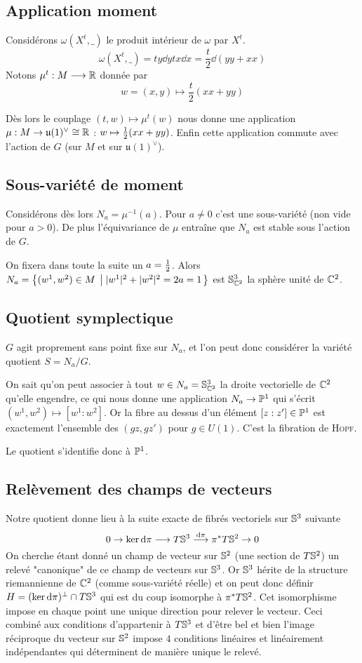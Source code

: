 \documentclass[a4paper,10pt]{article}
\begin{document}
\subsection{Application moment}
Considérons $\omega(X^t,\_)$ le produit intérieur de $\omega$ par $X^t$.
\[
\omega(X^t,\_) = ty\dd y tx \dd x = \dfrac{t}{2}\dd (yy + xx) 
\]
Notons $\mu^t : M \longrightarrow \R$ donnée par \[
w=(x,y) \mapsto \dfrac{t}{2}( xx + yy )\]

Dès lors le couplage $(t,w) \mapsto \mu^t(w)$ nous donne une application $\mu : M \rightarrow \mathfrak{u}(1)^\vee \cong \R$ : 
$w \mapsto \demi( xx + yy )$.
Enfin cette application commute avec l'action de $G$ (sur $M$ et sur $\mathfrak{u}(1)^\vee$).

\subsection{Sous-variété de moment}
Considérons dès lors $N_a = \mu^{-1}(a)$. Pour $a \neq 0$ c'est une sous-variété (non vide pour $a>0$). De plus l'équivariance de $\mu$ entraîne que $N_a$ est stable sous l'action de $G$.

On fixera dans toute la suite un $a=\demi$. Alors $N_a = \ens{(w^1,w^2)\in M}{|w^1|^2 + |w^2|^2 = 2a = 1}$ est $\S^3_{\C^2}$ la sphère unité de $\C^2$.

\subsection{Quotient symplectique}
$G$ agit proprement sans point fixe sur $N_a$, et l'on peut donc considérer la variété quotient $S = N_a/G$.

On sait qu'on peut associer à tout $w \in N_a = \S^3_{\C^2}$ la droite vectorielle de $\C^2$ qu'elle engendre, ce qui nous donne une application $N_a \rightarrow \Pro^1$ qui s'écrit $(w^1,w^2) \mapsto [w^1 : w^2]$. Or la fibre au dessus d'un élément $[z:z'] \in \Pro^1$ est exactement l'ensemble des $(gz,gz')$ pour $g \in U(1)$. C'est la fibration de \textsc{Hopf}.

Le quotient s'identifie donc à $\Pro^1$.

\subsection{Relèvement des champs de vecteurs}
Notre quotient donne lieu à la suite exacte de fibrés vectoriels sur $\S^3$ suivante
\[
0 \rightarrow \ker \dd \pi \longrightarrow T\S^3 \overset{\dd \pi}{\longrightarrow} \pi^* T\S^2 \rightarrow 0
\]
On cherche étant donné un champ de vecteur sur $\S^2$ (une section de $T\S^2$) un relevé "canonique" de ce champ de vecteurs sur $\S^3$. Or $\S^3$ hérite de la structure riemannienne de $\C^2$ (comme sous-variété réelle) et on peut donc définir $H = (\ker \dd \pi)^\bot \cap T\S^3$ qui est du coup isomorphe à $\pi^* T\S^2$. Cet isomorphisme impose en chaque point une unique direction pour relever le vecteur. Ceci combiné aux conditions d'appartenir à $T\S^3$ et d'être bel et bien l'image réciproque du vecteur sur $\S^2$ impose $4$ conditions linéaires et linéairement indépendantes qui déterminent de manière unique le relevé.
\end{document}
